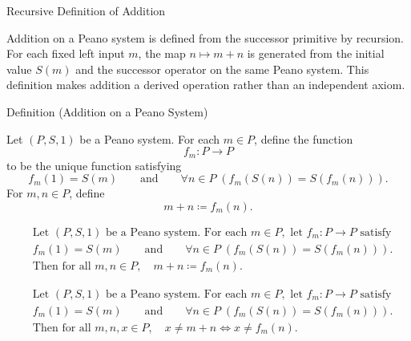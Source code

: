 \begin{topicbox}{Recursive Definition of Addition}
\begin{exposition}
Addition on a Peano system is defined from the successor primitive by
recursion. For each fixed left input $m$, the map $n \mapsto m+n$ is generated
from the initial value $S(m)$ and the successor operator on the same Peano
system. This definition makes addition a derived operation rather than an
independent axiom.
\end{exposition}

\begin{definitionbox}{Definition (Addition on a Peano System)}
\begin{definition}
\label{def:addition-on-peano-system}
Let $(P,S,1)$ be a Peano system. For each $m \in P$, define the function
\[
f_m : P \to P
\]
to be the unique function satisfying
\[
f_m(1)=S(m)
\qquad\text{and}\qquad
\forall n \in P\;(f_m(S(n))=S(f_m(n))).
\]
For $m,n \in P$, define
\[
m+n \coloneqq f_m(n).
\]
\end{definition}
\end{definitionbox}

\begin{remark*}
\[
\begin{aligned}
&\text{Let } (P,S,1) \text{ be a Peano system. For each } m \in P,
\text{ let } f_m : P \to P \text{ satisfy}\\
&f_m(1)=S(m)
\qquad\text{and}\qquad
\forall n \in P\;(f_m(S(n))=S(f_m(n))).\\
&\text{Then for all } m,n \in P,\quad m+n \coloneqq f_m(n).
\end{aligned}
\]
\end{remark*}

\begin{remark*}
\[
\begin{aligned}
&\text{Let } (P,S,1) \text{ be a Peano system. For each } m \in P,
\text{ let } f_m : P \to P \text{ satisfy}\\
&f_m(1)=S(m)
\qquad\text{and}\qquad
\forall n \in P\;(f_m(S(n))=S(f_m(n))).\\
&\text{Then for all } m,n,x \in P,\quad x \neq m+n
\Longleftrightarrow
x \neq f_m(n).
\end{aligned}
\]
\end{remark*}


\end{topicbox}
